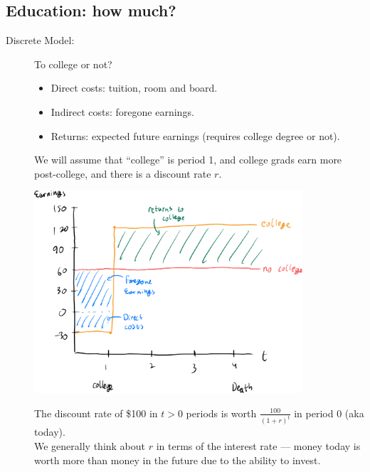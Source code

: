 \documentclass[10pt]{extarticle}
\begin{document}
\subsection{Education: how much?}%
  \begin{description}
    \item[Discrete Model:] To college or not?
      \begin{itemize}
        \item Direct costs: tuition, room and board.
        \item Indirect costs: foregone earnings.
        \item Returns: expected future earnings (requires college degree or not). 
      \end{itemize}
      We will assume that ``college'' is period 1, and college grads earn more post-college, and there is a discount rate $r$. 
      \begin{center}
        \includegraphics[width=10cm]{images/discrete_education_model.png}
      \end{center}
      The discount rate of \$100 in $t>0$ periods is worth $\frac{100}{(1+r)^t}$ in period $0$ (aka today).\\

      We generally think about $r$ in terms of the interest rate --- money today is worth more than money in the future due to the ability to invest.\\


\end{description}
\end{document}
